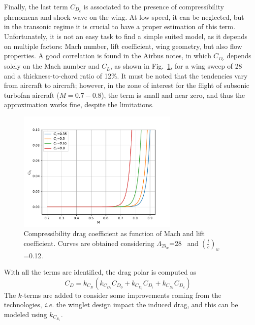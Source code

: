 Finally, the last term $C_{D_{c}}$ is associated to the presence of compressibility phenomena and shock wave on the wing. 
At low speed, it can be neglected, but in the transonic regime it is crucial to have a proper estimation of this term. 
Unfortunately, it is not an easy task to find a simple suited model, as it depends on multiple factors: Mach number, lift coefficient, wing geometry, but also flow properties. 
A good correlation is found in the Airbus notes, in which $C_{D_{c}}$ depends solely on the Mach number and $C_L$, as shown in Fig.~\ref{fig:cd_comp_example}, for a wing sweep of 28~\si{\deg} and a thickness-to-chord ratio of 12\%.
It must be noted that the tendencies vary from aircraft to aircraft; however, in the zone of interest for the flight of subsonic turbofan aircraft ($M=0.7-0.8$), the term is small and near zero, and thus the approximation works fine, despite the limitations. 
\begin{figure}[!h]
	\centering
	\includegraphics[keepaspectratio, width=0.7\textwidth]{images/chap2/cd_comp}
	\caption{Compressibility drag coefficient as function of Mach and lift coefficient. Curves are obtained considering $\Lambda_{25_{w}}$=28~\si{\deg} and $\left(\frac{t}{c}\right)_w$=0.12.}
	\label{fig:cd_comp_example}
\end{figure}

With all the terms are identified, the drag polar is computed as
\begin{equation}
\label{eq:cd_total}
C_D = k_{C_{D}}\left(k_{C_{D_{0}}}C_{D_{0}} + k_{C_{D_{i}}}C_{D_{i}} + k_{C_{D_{c}}} C_{D_{c}}\right)
\end{equation}
The $k$-terms are added to consider some improvements coming from the technologies, \textit{i.e.} the winglet design impact the induced drag, and this can be modeled using $k_{C_{D_{i}}}$. 

